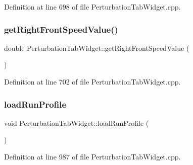 Definition at line 698 of file Perturbation\+Tab\+Widget.\+cpp.

\mbox{\label{class_perturbation_tab_widget_a11a37b5600c3003608515a8be459128c}} 
\subsubsection{\texorpdfstring{get\+Right\+Front\+Speed\+Value()}{getRightFrontSpeedValue()}}
{\footnotesize\ttfamily double Perturbation\+Tab\+Widget\+::get\+Right\+Front\+Speed\+Value (\begin{DoxyParamCaption}{ }\end{DoxyParamCaption})}



Definition at line 702 of file Perturbation\+Tab\+Widget.\+cpp.

\mbox{\label{class_perturbation_tab_widget_aeecb373be32ddc6ea3c165d685b2a386}} 
\subsubsection{\texorpdfstring{load\+Run\+Profile}{loadRunProfile}}
{\footnotesize\ttfamily void Perturbation\+Tab\+Widget\+::load\+Run\+Profile (\begin{DoxyParamCaption}{ }\end{DoxyParamCaption})\hspace{0.3cm}{\ttfamily [slot]}}



Definition at line 987 of file Perturbation\+Tab\+Widget.\+cpp.


